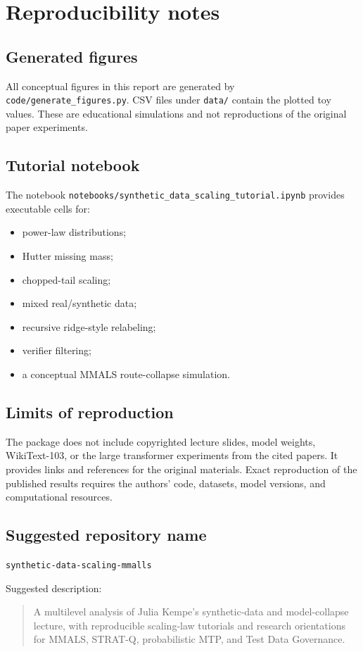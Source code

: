 \section{Reproducibility notes}

\subsection{Generated figures}

All conceptual figures in this report are generated by \texttt{code/generate\_figures.py}. CSV files under \texttt{data/} contain the plotted toy values. These are educational simulations and not reproductions of the original paper experiments.

\subsection{Tutorial notebook}

The notebook \texttt{notebooks/synthetic\_data\_scaling\_tutorial.ipynb} provides executable cells for:

\begin{itemize}[leftmargin=*]
  \item power-law distributions;
  \item Hutter missing mass;
  \item chopped-tail scaling;
  \item mixed real/synthetic data;
  \item recursive ridge-style relabeling;
  \item verifier filtering;
  \item a conceptual MMALS route-collapse simulation.
\end{itemize}

\subsection{Limits of reproduction}

The package does not include copyrighted lecture slides, model weights, WikiText-103, or the large transformer experiments from the cited papers. It provides links and references for the original materials. Exact reproduction of the published results requires the authors' code, datasets, model versions, and computational resources.

\subsection{Suggested repository name}

\texttt{synthetic-data-scaling-mmalls}

Suggested description:

\begin{quote}
A multilevel analysis of Julia Kempe's synthetic-data and model-collapse lecture, with reproducible scaling-law tutorials and research orientations for MMALS, STRAT-Q, probabilistic MTP, and Test Data Governance.
\end{quote}
